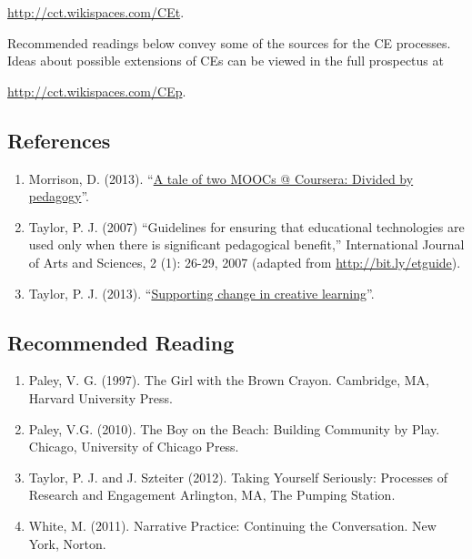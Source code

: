 \url{http://cct.wikispaces.com/CEt}.

\noindent Recommended readings below convey some of the sources for the CE
processes.~ Ideas about possible extensions of CEs can be viewed in the
full prospectus at

\url{http://cct.wikispaces.com/CEp}.

\subsection{References}\label{references}

\begin{enumerate}
\def\labelenumi{\arabic{enumi}.}
\item
  Morrison, D. (2013). ``\href{http://bit.ly/164uqkJ}{A tale of two
  MOOCs @ Coursera: Divided by pedagogy}''.
\item
  Taylor, P. J. (2007) ``Guidelines for ensuring that educational
  technologies are used only when there is significant pedagogical
  benefit,'' International Journal of Arts and Sciences, 2 (1): 26-29,
  2007 (adapted from \url{http://bit.ly/etguide}).
\item
  Taylor, P. J. (2013). ``\href{http://wp.me/p1gwfa-vv}{Supporting
  change in creative learning}''.
\end{enumerate}

\subsection{Recommended Reading}\label{recommended-reading}

\begin{enumerate}
\def\labelenumi{\arabic{enumi}.}
\item
  Paley, V. G. (1997). The Girl with the Brown Crayon. Cambridge, MA,
  Harvard University Press.
\item
  Paley, V.G. (2010). The Boy on the Beach: Building Community by Play.
  Chicago, University of Chicago Press.
\item
  Taylor, P. J. and J. Szteiter (2012). Taking Yourself Seriously:
  Processes of Research and Engagement Arlington, MA, The Pumping
  Station.
\item
  White, M. (2011). Narrative Practice: Continuing the Conversation. New
  York, Norton.
\end{enumerate}
